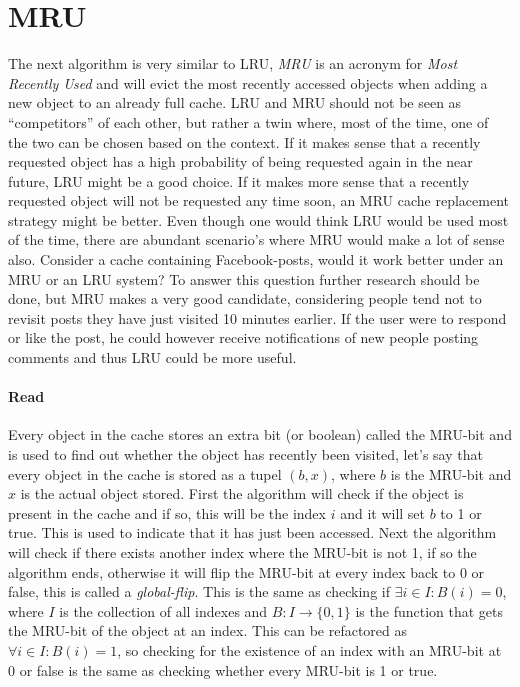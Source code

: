 \documentclass[pdftex,a4paper,12pt,twoside]{report}
\begin{document}
\section{MRU}
The next algorithm is very similar to LRU, \emph{MRU} is an acronym for \emph{Most Recently Used} and will evict the most recently accessed objects when adding a new object to an already full cache. LRU and MRU should not be seen as ``competitors'' of each other, but rather a twin where, most of the time, one of the two can be chosen based on the context.
If it makes sense that a recently requested object has a high probability of being requested again in the near future, LRU might be a good choice. If it makes more sense that a recently requested object will not be requested any time soon, an MRU cache replacement strategy might be better. Even though one would think LRU would be used most of the time, there are abundant scenario's where MRU would make a lot of sense also. Consider a cache containing Facebook-posts, would it work better under an MRU or an LRU system? To answer this question further research should be done, but MRU makes a very good candidate, considering people tend not to revisit posts they have just visited 10 minutes earlier. If the user were to respond or like the post, he could however receive notifications of new people posting comments and thus LRU could be more useful.
\paragraph{Read} Every object in the cache stores an extra bit (or boolean) called the MRU-bit and is used to find out whether the object has recently been visited, let's
say that every object in the cache is stored as a tupel $(b,x)$, where $b$ is the MRU-bit and $x$ is the actual object stored. First the algorithm will check if the object is present in the cache and if so, this will be the index $i$ and it will set $b$ to 1 or true. This is used to indicate that it has just been accessed. Next the algorithm will check if there exists another index where the MRU-bit is not 1, if so the algorithm ends, otherwise it will flip the MRU-bit at every index back to 0 or false, this is called a 
\emph{global-flip}. This is the same as checking if $\exists i \in I : B(i) = 0$, where $I$ is the collection of all indexes and $B : I \to \{0,1\}$ is the function that gets the MRU-bit of the object at an index. This can be refactored as $\forall i \in I : B(i) = 1$, so checking for the existence of an index with an MRU-bit at 0 or false is the same as checking whether every MRU-bit is 1 or true.
\end{document}
